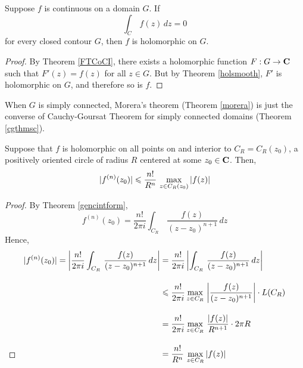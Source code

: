 \vspace*{1em}

\begin{theorem}\label{morera}
Suppose $f$ is continuous on a domain $G$. If
\[\int_C\,f(z)\,dz = 0\]
for every closed contour $G$, then $f$ is holomorphic on $G$. 
\end{theorem}
\begin{proof}
By Theorem \ref{FTCoCI}, there exists a holomorphic function $F:G \to \mathbf C$ such that $F'(z) = f(z)$ for all $z \in G$. But by Theorem \ref{holsmooth}, $F'$ is holomorphic on $G$, and therefore so is $f$. 
\end{proof}

\vspace*{1em}

\begin{remark}
When $G$ is simply connected, Morera's theorem (Theorem \ref{morera}) is just the converse of Cauchy-Goursat Theorem for simply connected domains (Theorem \ref{cgthmsc}).
\end{remark}

\vspace*{1em}

\begin{theorem}\label{cauchyineq}
Suppose that $f$ is holomorphic on all points on and interior to $C_R = C_R(z_0)$, a positively oriented circle of radius $R$ centered at some $z_0 \in \mathbf C$. Then,
\[|f^{(n)}(z_0)| \leqslant \frac{n!}{R^n}\,\max_{z \in C_R(z_0)}\left\lvert f(z)\right\rvert\]
\end{theorem}
\begin{proof}
By Theorem \ref{gencintform}, 
\[f^{(n)}(z_0) = \frac{n!}{2\pi i}\int_{C_R}\,\frac{f(z)}{(z - z_0)^{n+1}}\,dz\]
Hence, 
\begin{align*}
|f^{(n)}(z_0)|= \left\lvert\frac{n!}{2\pi i}\int_{C_R}\,\frac{f(z)}{(z - z_0)^{n+1}}\,dz\right\rvert &= \frac{n!}{2\pi i}\left\lvert\int_{C_R}\,\frac{f(z)}{(z - z_0)^{n+1}}\,dz\right\rvert\\[1em]
&\leqslant \frac{n!}{2\pi i}\max_{z \in C_R}\,\left\lvert\frac{f(z)}{(z - z_0)^{n+1}}\right\rvert\cdot L(C_R)\\[1em]
&= \frac{n!}{2\pi i}\max_{z \in C_R}\,\frac{\left\lvert f(z)\right\rvert}{R^{n+1}}\cdot 2\pi R\\[1em]
&= \frac{n!}{R^n}\,\max_{z \in C_R}\left\lvert f(z)\right\rvert\\[-2.5em]
\end{align*}
\end{proof}

\vspace*{2em}

